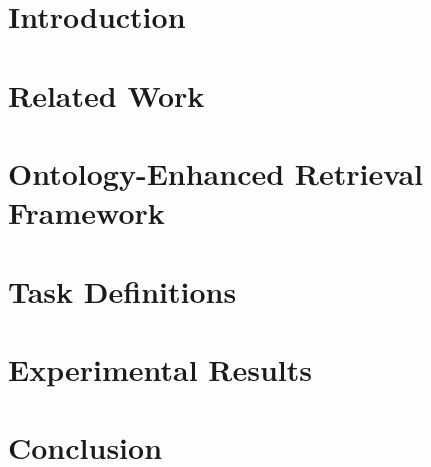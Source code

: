 \documentclass[conference]{IEEEtran}
\begin{document}
\section{Introduction}


\section{Related Work}


\section{Ontology-Enhanced Retrieval Framework}


\section{Task Definitions}


\section{Experimental Results}


\section{Conclusion}




\end{document}
